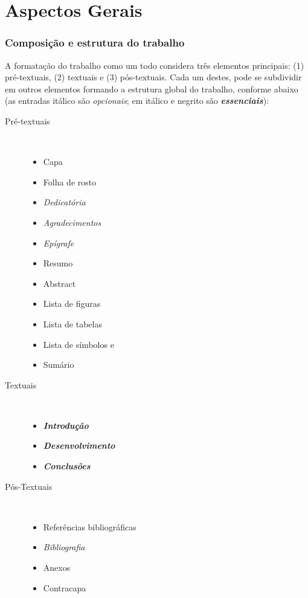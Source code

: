 \part{Aspectos Gerais}




\section{Composição e estrutura do trabalho}

A formatação do trabalho como um todo considera três elementos principais: 
(1) pré-textuais, (2) textuais e (3) pós-textuais. Cada um destes, pode se 
subdividir em outros elementos formando a estrutura global do trabalho, 
conforme abaixo (as entradas itálico são \textit{opcionais}; em itálico e
negrito são \textbf{\textit{essenciais}}):

\begin{description}
	\item [Pré-textuais] \

	\begin{itemize}
		\item Capa
		\item Folha de rosto
		\item \textit{Dedicatória}
		\item \textit{Agradecimentos}
		\item \textit{Epígrafe}
		\item Resumo
		\item Abstract
		\item Lista de figuras
		\item Lista de tabelas
		\item Lista de símbolos e
		\item Sumário
	\end{itemize}

	\item [Textuais] \

	\begin{itemize}
		\item \textbf{\textit{Introdução}}
		\item \textbf{\textit{Desenvolvimento}}
		\item \textbf{\textit{Conclusões}}
	\end{itemize}

	\item [Pós-Textuais] \
	
	\begin{itemize}
		\item Referências bibliográficas
		\item \textit{Bibliografia}
		\item Anexos
		\item Contracapa
	\end{itemize}
\end{description}

